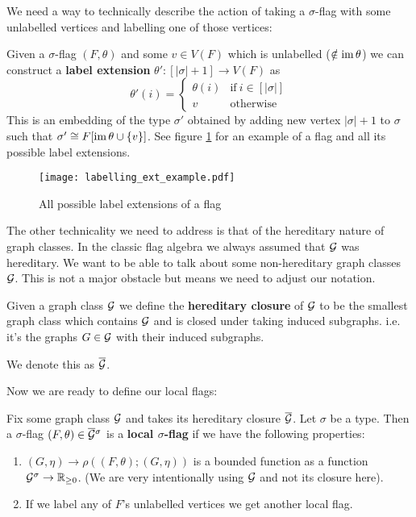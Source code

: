 We need a way to technically describe the action of taking a $\sigma$-flag with some
unlabelled vertices and labelling one of those vertices:

\begin{definition}
    Given a $\sigma$-flag $(F, \theta)$ and some $v\in V(F)$ which is unlabelled
    ($\notin\operatorname{im}\theta$) we can construct a \textbf{label extension}
    $\theta'\colon [|\sigma|+1] \to V(F)$ as
    \[
        \theta'(i) = \begin{cases}
            \theta(i) & \text{if}\ i\in[|\sigma|]\\
            v & \text{otherwise}
        \end{cases}
    \]
    This is an embedding of the type $\sigma'$ obtained by adding new vertex $|\sigma|+1$
    to $\sigma$ such that $\sigma' \cong F[\operatorname{im} \theta \cup \{v\}]$. See figure
    \ref{fig:labelling_ext_example} for an example of a flag and all its possible label
    extensions.
\end{definition}

\begin{figure}[ht]
    \centering
    \texttt{[image: labelling\_ext\_example.pdf]}
    \caption{All possible label extensions of a flag}
    \label{fig:labelling_ext_example}
\end{figure}

The other technicality we need to address is that of the hereditary nature of graph
classes. In the classic flag algebra we always assumed that $\mathcal{G}$ was hereditary. We want
to be able to talk about some non-hereditary graph classes $\mathcal{G}$. This is not a major
obstacle but means we need to adjust our notation.

\begin{definition}
    Given a graph class $\mathcal{G}$ we define the \textbf{hereditary closure} of $\mathcal{G}$ to be
    the smallest graph class which contains $\mathcal{G}$ and is closed under taking
    induced subgraphs. i.e. it's the graphs $G\in\mathcal{G}$ with their induced subgraphs.

    We denote this as $\overline{\mathcal{G}}$.
\end{definition}

Now we are ready to define our local flags:

\begin{definition}
    \label{def:local_flag}
    Fix some graph class $\mathcal{G}$ and takes its hereditary closure $\overline{\mathcal{G}}$.
    Let $\sigma$ be a type. Then a $\sigma$-flag $(F, \theta)\in\overline{\mathcal{G}}{}^\sigma$ is a
    \textbf{local $\sigma$-flag} if we have the following properties:
    \begin{enumerate}
        \item $(G,\eta) \to \rho((F,\theta); (G,\eta))$ is a bounded function as a function
            $\mathcal{G}^\sigma\to\mathbb{R}_{\geq 0}$. (We are very intentionally using $\mathcal{G}$ and not its closure here).
        \item If we label any of $F$'s unlabelled vertices we get another local flag.
    \end{enumerate}
\end{definition}


